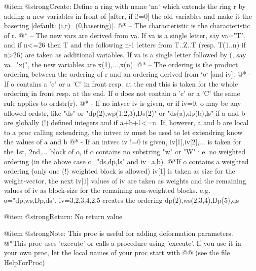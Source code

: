 @item @strong{Create:}
Define a ring with name `na` which extends the ring r by adding n new
variables in front of [after, if i!=0] the old variables and make it
the basering [default: (i,r)=(0,basering)].
@* -- The characteristic is the characteristic of r.
@* -- The new vars are derived from va. If va is a single letter, say
va="T", and if n<=26 then T and the following n-1 letters from
T..Z..T (resp. T(1..n) if n>26) are taken as additional variables.
If va is a single letter followed by (, say va="x(", the new
variables are x(1),...,x(n).
@* -- The ordering is the product ordering between the ordering of r and
an ordering derived from `o` [and iv].
@* - If o contains a 'c' or a 'C' in front resp. at the end this is
taken for the whole ordering in front resp. at the end. If o does
not contain a 'c' or a 'C' the same rule applies to ordstr(r).
@* - If no intvec iv is given, or if iv=0, o may be any allowed ordstr,
like "ds" or "dp(2),wp(1,2,3),Ds(2)" or "ds(a),dp(b),ls" if
a and b are globally (!) defined integers and if a+b+1<=n.
If, however, a and b are local to a proc calling extendring, the
intvec iv must be used to let extendring know the values of a and b
@* - If an intvec iv !=0 is given, iv[1],iv[2],... is taken for the
1st, 2nd,... block of o, if o contains no substring "w" or "W"
i.e. no weighted ordering (in the above case o="ds,dp,ls"
and iv=a,b).
@*If o contains a weighted ordering (only one (!) weighted block is
allowed) iv[1] is taken as size for the weight-vector, the next
iv[1] values of iv are taken as weights and the remaining values of
iv as block-size for the remaining non-weighted blocks.
e.g. o="dp,ws,Dp,ds", iv=3,2,3,4,2,5 creates the ordering
dp(2),ws(2,3,4),Dp(5),ds

@item @strong{Return:}
No return value

@item @strong{Note:}
This proc is useful for adding deformation parameters.
@*This proc uses 'execute' or calls a procedure using 'execute'.
If you use it in your own proc, let the local names of your proc
start with @@ (see the file HelpForProc)

